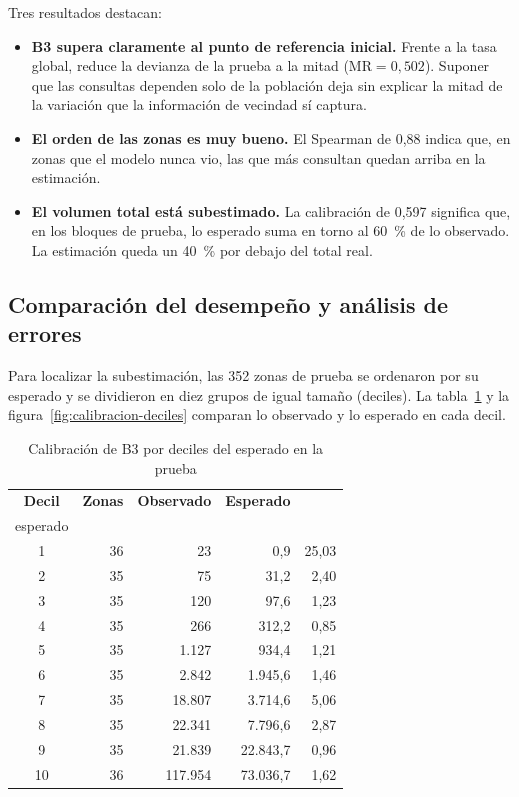 Tres resultados destacan:
\begin{itemize}
  \item \textbf{B3 supera claramente al punto de referencia inicial.} Frente a la tasa
        global, reduce la devianza de la prueba a la mitad ($\mathrm{MR} = 0{,}502$). Suponer que
        las consultas dependen solo de la población deja sin explicar la mitad de la
        variación que la información de vecindad sí captura.
  \item \textbf{El orden de las zonas es muy bueno.} El Spearman de 0,88 indica que, en
        zonas que el modelo nunca vio, las que más consultan quedan arriba en la estimación.
  \item \textbf{El volumen total está subestimado.} La calibración de 0,597 significa que,
        en los bloques de prueba, lo esperado suma en torno al 60~\% de lo observado. La
        estimación queda un 40~\% por debajo del total real.
\end{itemize}

\subsection{Comparación del desempeño y análisis de errores}
\label{sec:analisis-errores}

Para localizar la subestimación, las 352 zonas de prueba se ordenaron por su esperado y se
dividieron en diez grupos de igual tamaño (deciles). La tabla~\ref{tab:calibracion-deciles}
y la figura~\ref{fig:calibracion-deciles} comparan lo observado y lo esperado en cada
decil.

\begin{table}[H]
  \centering
  \caption{Calibración de B3 por deciles del esperado en la prueba}
  \label{tab:calibracion-deciles}
  \interlineadoSimple
  \small
  \begin{tabular}{@{}crrrr@{}}
    \toprule
    \textbf{Decil} & \textbf{Zonas} & \textbf{Observado} & \textbf{Esperado} & \textbf{\celda{Observado /\\esperado}} \\
    \midrule
    1 & 36 & 23 & 0,9 & 25,03 \\
    2 & 35 & 75 & 31,2 & 2,40 \\
    3 & 35 & 120 & 97,6 & 1,23 \\
    4 & 35 & 266 & 312,2 & 0,85 \\
    5 & 35 & 1.127 & 934,4 & 1,21 \\
    6 & 35 & 2.842 & 1.945,6 & 1,46 \\
    7 & 35 & 18.807 & 3.714,6 & 5,06 \\
    8 & 35 & 22.341 & 7.796,6 & 2,87 \\
    9 & 35 & 21.839 & 22.843,7 & 0,96 \\
    10 & 36 & 117.954 & 73.036,7 & 1,62 \\
    \bottomrule
  \end{tabular}
\end{table}

